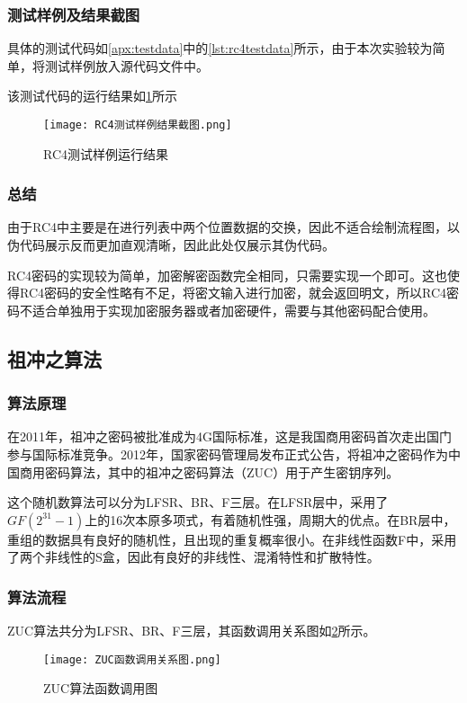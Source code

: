 \documentclass[a4paper, zihao=-4, UTF-8]{ctexart}
\begin{document}
				\subsubsection{测试样例及结果截图}
					具体的测试代码如\cref{apx:testdata}中的\cref{lst:rc4testdata}所示，由于本次实验较为简单，将测试样例放入源代码文件中。
					
					该测试代码的运行结果如\cref{fig:rc4result}所示
					\begin{figure}[htbp]
						\centering
						\texttt{[image: RC4测试样例结果截图.png]}
						\caption{RC4测试样例运行结果}
						\label{fig:rc4result}
					\end{figure}
				\subsubsection{总结}
					由于RC4中主要是在进行列表中两个位置数据的交换，因此不适合绘制流程图，以伪代码展示反而更加直观清晰，因此此处仅展示其伪代码。
					
					RC4密码的实现较为简单，加密解密函数完全相同，只需要实现一个即可。这也使得RC4密码的安全性略有不足，将密文输入进行加密，就会返回明文，所以RC4密码不适合单独用于实现加密服务器或者加密硬件，需要与其他密码配合使用。
			\subsection{祖冲之算法}
				\subsubsection{算法原理}
					在2011年，祖冲之密码被批准成为4G国际标准，这是我国商用密码首次走出国门参与国际标准竞争。2012年，国家密码管理局发布正式公告，将祖冲之密码作为中国商用密码算法，其中的祖冲之密码算法（ZUC）用于产生密钥序列。
					
					这个随机数算法可以分为LFSR、BR、F三层。在LFSR层中，采用了$GF(2^{31}-1)$上的16次本原多项式，有着随机性强，周期大的优点。在BR层中，重组的数据具有良好的随机性，且出现的重复概率很小。在非线性函数F中，采用了两个非线性的S盒，因此有良好的非线性、混淆特性和扩散特性。
				\subsubsection{算法流程}
					ZUC算法共分为LFSR、BR、F三层，其函数调用关系图如\cref{fig:zuc-function}所示。
					\begin{figure}[htbp]
						\centering
						\texttt{[image: ZUC函数调用关系图.png]}
						\caption{ZUC算法函数调用图}
						\label{fig:zuc-function}
					\end{figure}
\end{document}
